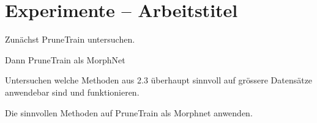 \chapter{Experimente -- Arbeitstitel}

Zunächst PruneTrain untersuchen. 

Dann PruneTrain als MorphNet

Untersuchen welche Methoden aus 2.3 überhaupt sinnvoll auf grössere Datensätze anwendebar sind und funktionieren.

Die sinnvollen Methoden auf PruneTrain als Morphnet anwenden.






